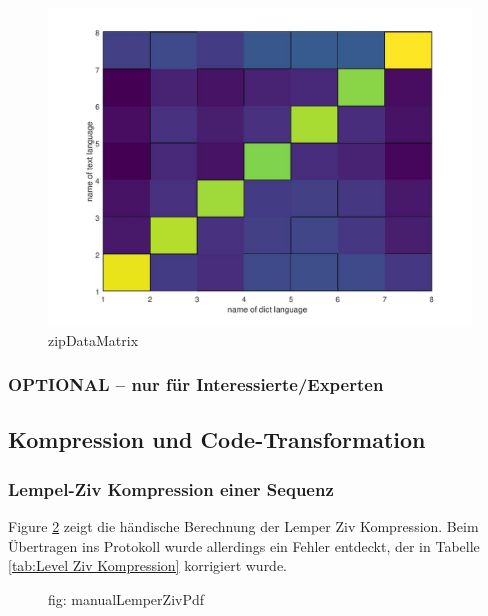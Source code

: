 \documentclass[12pt,german]{article}
\begin{document}
\begin{figure}[H]
	\centering
	\includegraphics[width=12cm]{images/resultZipData.jpg}
	\caption{zipDataMatrix}
	\label{fig: zipDataMatrix}
\end{figure}



\subsubsection{OPTIONAL – nur für Interessierte/Experten}


\subsection{Kompression und Code-Transformation}
\subsubsection{Lempel-Ziv Kompression einer Sequenz}
Figure \ref{fig: manualLemperZivPdf} zeigt die händische Berechnung der Lemper Ziv Kompression. Beim Übertragen ins Protokoll wurde allerdings ein Fehler entdeckt, der in Tabelle \ref{tab:Level Ziv Kompression} korrigiert wurde.


\begin{figure}[H]
	
	\label{fig: manualLemperZivPdf}
	\caption{fig: manualLemperZivPdf}
\end{figure}
\end{document}
